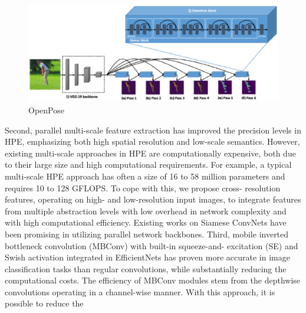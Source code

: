 \documentclass{fisatprojectfinal}
\begin{document}
\begin{figure}[h!]
	\begin{center}
	\includegraphics[scale=.8]{OpenPose}
	\caption{OpenPose}
	\end{center}
	\end{figure}
\par
Second, parallel multi-scale feature extraction has improved
the precision levels in HPE, emphasizing
both high spatial resolution and low-scale semantics.
However, existing multi-scale approaches in HPE are
computationally expensive, both due to their large size and
high computational requirements. For example, a typical
multi-scale HPE approach has often a size of 16 to 58
million parameters and requires 10 to 128 GFLOPS. To cope with this, we propose cross-
resolution features, operating on high- and low-resolution
input images, to integrate features from multiple abstraction
levels with low overhead in network complexity and with
high computational efficiency. Existing works on Siamese
ConvNets have been promising in utilizing parallel network
backbones. Third, mobile inverted bottleneck
convolution (MBConv) with built-in squeeze-and-
excitation (SE) and Swish activation integrated
in EfficientNets has proven more accurate in image
classification tasks than regular convolutions, while substantially reducing the computational costs. The efficiency of MBConv modules stem from
the depthwise convolutions operating in a channel-wise
manner. With this approach, it is possible to reduce the
\end{document}
